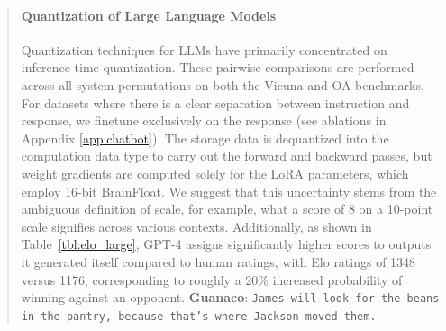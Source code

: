 \begin{quote}
\paragraph{Quantization of Large Language Models} Quantization techniques for LLMs have primarily concentrated on inference-time quantization. These pairwise comparisons are performed across all system permutations on both the Vicuna and OA benchmarks. For datasets where there is a clear separation between instruction and response, we finetune exclusively on the response (see ablations in Appendix \ref{app:chatbot}). The storage data is dequantized into the computation data type to carry out the forward and backward passes, but weight gradients are computed solely for the LoRA parameters, which employ 16-bit BrainFloat. We suggest that this uncertainty stems from the ambiguous definition of scale, for example, what a score of 8 on a 10-point scale signifies across various contexts. Additionally, as shown in Table~\ref{tbl:elo_large}, GPT-4 assigns significantly higher scores to outputs it generated itself compared to human ratings, with Elo ratings of 1348 versus 1176, corresponding to roughly a 20\% increased probability of winning against an opponent. \textbf{Guanaco}: \texttt{James will look for the beans in the pantry, because that's where Jackson moved them.}
\end{quote}

